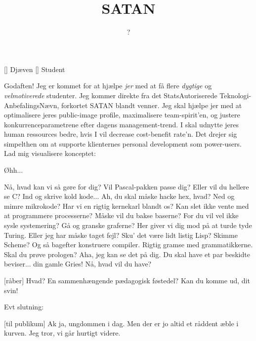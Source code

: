 \documentclass[a4paper,11pt]{article}
\title{SATAN}
\author{?}
\begin{document}
\maketitle

\begin{roles}
  [] Djæven
  [] Student
\end{roles}


\begin{sketch}


   Godaften!  Jeg er kommet for at hjælpe {\em jer} med at få
  flere {\em dygtige} og {\em velmotiverede} studenter.  Jeg kommer
  direkte fra det StatsAutoriserede Teknologi-AnbefalingsNævn,
  forkortet SATAN blandt venner.  Jeg skal hjælpe jer med at
  optimalisere jeres public-image profile, maximalisere
  team-spirit'en, og justere konkurrenceparametrene efter dagens
  management-trend.  I skal udnytte jeres human ressources bedre, hvis
  I vil decrease cost-benefit rate'n.  Det drejer sig simpelthen om at
  supporte klienternes personal development som power-users.  Lad mig
  visualisere konceptet: 


     Øhh...


     Nå, hvad kan vi så gøre for dig?  Vil Pascal-pakken passe
    dig?  Eller vil du hellere se C?  Ind og skrive kold kode... Ah, du
    skal måske hacke hex, hvad?  Ned og mimre mikrokode?  Har vi en rigtig
    kernekarl blandt os?  Kan slet ikke vente med at programmere
    processerne?  Måske vil du bakse baserne?  For du vil vel ikke sysle
    systemering?  Gå og granske graferne?  Her giver vi dig mod på at
    turde tyde Turing.  Eller jeg har måske taget fejl?  Sku' det være
    lidt listig Lisp?  Skimme Scheme?  Og så bagefter konstruere compiler.
    Rigtig gramse med grammatikkerne.  Skal du prøve prologen?  Aha, jeg
    kan se det på dig.  Du skal have et par beskidte beviser... din gamle
    Gries!  Nå, hvad vil du have?


    [råber] Hvad?  En sammenhængende pædagogisk føstedel?  Kan du
    komme ud, dit svin! 

    Evt slutning:

    [til publikum] Ak ja, ungdommen i dag.  Men der er jo altid et
    råddent æble i kurven.  Jeg tror, vi går hurtigt videre.


  \end{sketch}
\end{document}
